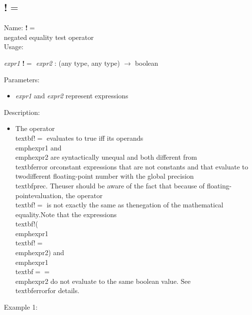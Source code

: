 \subsection{!$=$}
\label{labneq}
\noindent Name: \textbf{!$=$}\\
negated equality test operator\\
\noindent Usage: 
\begin{center}
\emph{expr1} \textbf{!$=$} \emph{expr2} : (\textsf{any type}, \textsf{any type}) $\rightarrow$ \textsf{boolean}\\
\end{center}
Parameters: 
\begin{itemize}
\item \emph{expr1} and \emph{expr2} represent expressions
\end{itemize}
\noindent Description: \begin{itemize}

\item The operator \\textbf{!$=$} evaluates to true iff its operands \\emph{expr1} and\n   \\emph{expr2} are syntactically unequal and both different from \\textbf{error} or\n   constant expressions that are not constants and that evaluate to two\n   different floating-point number with the global precision \\textbf{prec}. The\n   user should be aware of the fact that because of floating-point\n   evaluation, the operator \\textbf{!$=$} is not exactly the same as the\n   negation of the mathematical equality.\n     \n   Note that the expressions \\textbf{!}(\\emph{expr1} \\textbf{!$=$} \\emph{expr2}) and \\emph{expr1}\n   \\textbf{$==$} \\emph{expr2} do not evaluate to the same boolean value. See \\textbf{error}\n   for details.\n\end{itemize}
\noindent Example 1: 
\begin{center}\begin{minipage}{15cm}\begin{Verbatim}[frame=single]
\end{Verbatim}
\end{minipage}\end{center}
